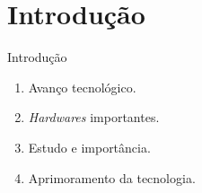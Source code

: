 \section{Introdução}

\begin{frame}{Introdução}

\begin{enumerate}
 \item {Avanço tecnológico.}
 \item {\textit{Hardwares} importantes.}
 \item {Estudo e importância.}
 \item {Aprimoramento da tecnologia.}
\end{enumerate}

\end{frame}